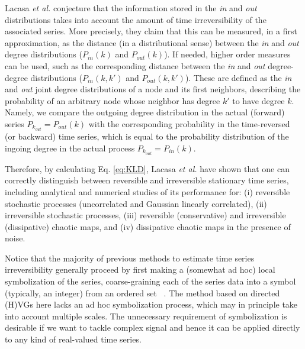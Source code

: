 		Lacasa \textit{et al.}\cite{Lacasa2012, Lacasa2015} conjecture that the information stored in the \textit{in} and \textit{out} distributions takes into account the amount of time irreversibility of the associated series. More precisely, they claim that this can be measured, in a first approximation, as the distance (in a distributional sense) between the \textit{in} and \textit{out} degree distributions ($P_{in}(k)$ and $P_{out}(k)$). If needed, higher order measures can be used, such as the corresponding distance between the \textit{in} and \textit{out} degree-degree distributions ($P_{in}(k, k')$ and $P_{out}(k, k')$). These are defined as the \textit{in} and \textit{out} joint degree distributions of a node and its first neighbors, describing the probability of an arbitrary node whose neighbor  has degree $k'$ to have degree $k$. Namely, we compare the outgoing degree distribution in the actual (forward) series $P_{k_{out}} = P_{out}(k)$ with the corresponding probability in the time-reversed (or backward) time series, which is equal to the probability distribution of the ingoing degree in the actual process $P_{k_{out}} = P_{in}(k)$. 
		
		Therefore, by calculating Eq. \eqref{eq:KLD}, Lacasa \textit{et al.}\cite{Lacasa2012} have shown that one can correctly distinguish between reversible and irreversible stationary time series, including analytical and numerical studies of its performance for: (i) reversible stochastic processes (uncorrelated and Gaussian linearly correlated), (ii) irreversible stochastic processes, (iii) reversible (conservative) and irreversible (dissipative) chaotic maps, and (iv) dissipative chaotic maps in the presence of noise. 	
		
		Notice that the majority of previous methods to estimate time series irreversibility generally proceed by first making a (somewhat ad hoc) local symbolization of the series, coarse-graining each of the series data into a symbol (typically, an integer) from an ordered set ~\cite{Daw2000,Kennel2004,Cammarota2007,Costa2005,Porporato2007,Roldan2010}. The method based on directed (H)VGs here lacks an ad hoc symbolization process, which may in principle take into account multiple scales. The unnecessary requirement of symbolization is desirable if we want to tackle complex signal and hence it can be applied directly to any kind of real-valued time series.  

